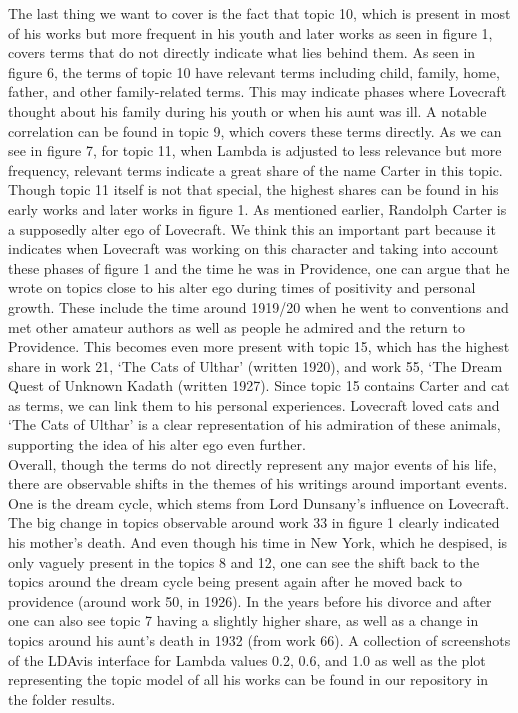 The last thing we want to cover is the fact that topic 10, which is present in most of his works 
but more frequent in his youth and later works as seen in figure 1, covers terms that do not directly 
indicate what lies behind them. As seen in figure 6, the terms of topic 10 have relevant terms 
including child, family, home, father, and other family-related terms. This may indicate phases 
where Lovecraft thought about his family during his youth or when his aunt was ill. A notable 
correlation can be found in topic 9, which covers these terms directly. As we can see in figure 
7, for topic 11, when Lambda is adjusted to less relevance but more frequency, relevant terms 
indicate a great share of the name Carter in this topic. Though topic 11 itself is not that special, 
the highest shares can be found in his early works and later works in figure 1. As mentioned earlier, 
Randolph Carter is a supposedly alter ego of Lovecraft. We think this an important part because it 
indicates when Lovecraft was working on this character and taking into account these phases of figure 
1 and the time he was in Providence, one can argue that he wrote on topics close to his alter ego 
during times of positivity and personal growth. These include the time around 1919/20 when he went 
to conventions and met other amateur authors as well as people he admired and the return to Providence. 
This becomes even more present with topic 15, which has the highest share in work 21, ‘The Cats of 
Ulthar’ (written 1920), and work 55, ‘The Dream Quest of Unknown Kadath (written 1927). Since topic 
15 contains Carter and cat as terms, we can link them to his personal experiences. Lovecraft loved 
cats and ‘The Cats of Ulthar’ is a clear representation of his admiration of these animals, 
supporting the idea of his alter ego even further.\\

Overall, though the terms do not directly represent any major events of his life, there are 
observable shifts in the themes of his writings around important events. One is the dream cycle, 
which stems from Lord Dunsany’s influence on Lovecraft. The big change in topics observable around 
work 33 in figure 1 clearly indicated his mother’s death. And even though his time in New York, 
which he despised, is only vaguely present in the topics 8 and 12, one can see the shift back to 
the topics around the dream cycle being present again after he moved back to providence (around 
work 50, in 1926). In the years before his divorce and after one can also see topic 7 having a 
slightly higher share, as well as a change in topics around his aunt's death in 1932 (from work 
66). A collection of screenshots of the LDAvis interface for Lambda values 0.2, 0.6, and 1.0 as 
well as the plot representing the topic model of all his works can be found in our repository in 
the folder results.
